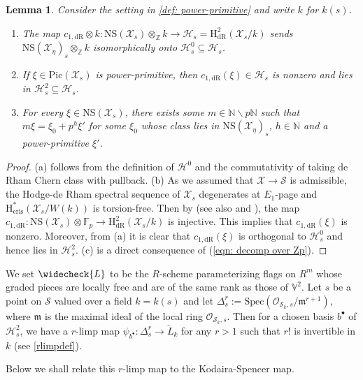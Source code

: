 \documentclass[letter, 11pt]{article}
\theoremstyle{plain}
\newtheorem{lemma}[subsubsection]{Lemma}
\theoremstyle{definition}
\newcommand{\IF}{\mathbb{F}}
\newcommand{\IN}{\mathbb{N}}
\newcommand{\IV}{\mathbb{V}}
\newcommand{\IZ}{\mathbb{Z}}
\newcommand{\Spec}{\mathrm{Spec}}
\newcommand{\che}[1]{\widecheck{#1}}
\newcommand\tensor{{\otimes}}
\newcommand{\<}{\langle}
\renewcommand{\>}{\rangle}
\newcommand{\sH}{\mathcal{H}}
\newcommand{\sX}{\mathcal{X}}
\newcommand{\sS}{\mathcal{S}}
\newcommand{\sO}{\mathcal{O}}
\newcommand{\Pic}{\mathrm{Pic}}
\renewcommand{\H}{\mathrm{H}}
\newcommand{\dR}{\mathrm{dR}}
\newcommand{\cris}{\mathrm{cris}}
\newcommand{\NS}{\mathrm{NS}}
\newcommand{\fm}{\mathfrak{m}}
\begin{document}
\begin{lemma}
    \label{lem: primitive line bundle} Consider the setting in \ref{def: power-primitive} and write $k$ for $k(s)$. 
    \begin{enumerate}[label=\upshape{(\alph*)}]
        \item The map $c_{1, \dR} \tensor k : \NS(\sX_s) \tensor_\IZ k \to \sH_s = \H^2_\dR(\sX_s/k)$ sends $\NS(\sX_\eta)_s \tensor_\IZ k$ isomorphically onto $\sH^0_s \subseteq \sH_s$. 
        \item If $\xi \in \Pic(\sX_s)$ is power-primitive, then $c_{1, \dR}(\xi) \in \sH_s$ is nonzero and lies in $\sH^2_s \subseteq \sH_s$. 
        \item For every $\xi \in \NS(\sX_s)$, there exists some $m \in \IN \smallsetminus p \IN$ such that $m \xi = \xi_0 + p^h \xi'$ for some $\xi_0$ whose class lies in $\NS(\sX_\eta)_s$, $h \in \IN$ and a power-primitive $\xi'$.  
    \end{enumerate}
\end{lemma}
\begin{proof}
    (a) follows from the definition of $\sH^0$ and the commutativity of taking de Rham Chern class with pullback. (b) As we assumed that $\sX \to \sS$ is admissible, the Hodge-de Rham spectral sequence of $\sX_s$ degenerates at $E_1$-page and $\H^*_\cris(\sX_s/W(k))$ is torsion-free. Then by \cite[Rmk~3.5]{Del02} (see also \cite[Cor.~5.18]{Illusie} and \cite[Cor.~1.4]{OgusCrystals}), the  map $c_{1, \dR} : \NS(\sX_s) \tensor \IF_p \to \H^2_\dR(\sX_s/k)$ is injective. This implies that $c_{1, \dR}(\xi)$ is nonzero. Moreover, from (a) it is clear that $c_{1, \dR}(\xi)$ is orthogonal to $\sH^0_s$ and hence lies in $\sH^2_s$. (c) is a direct consequence of (\ref{eqn: decomp over Zp}). 
\end{proof}

We set $\che{L}$ to be the $R$-scheme parameterizing flags on $R^{m}$ whose graded pieces are locally free and are of the same rank as those of $\IV^2$. Let $s$ be a point on $\sS$ valued over a field $k = k(s)$ and let $\Delta^r_s := \Spec(\sO_{\sS_k, s}/\fm^{r + 1})$, where $\fm$ is the maximal ideal of the local ring $\sO_{\sS_k, s}$. Then for a chosen basis $b^\bullet$ of $\sH^2_s$, we have a $r$-limp map $\psi_{b^\bullet} : \Delta^r_s \to \check{L}_k$ for any $r > 1$ such that $r!$ is invertible in $k$ (see \ref{rlimpdef}). 

Below we shall relate this $r$-limp map to the Kodaira-Spencer map. 

\end{document}

